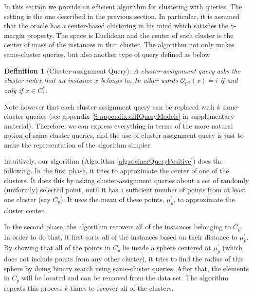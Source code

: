 \documentclass{article}
\newcommand{\mc}{\mathcal}
\newtheorem{definition}[theorem]{Definition}
\begin{document}
In this section we provide an efficient algorithm for clustering with queries. The setting is the one described in the previous section. In particular, it is assumed that the oracle has a center-based clustering in his mind which satisfies the $\gamma$-margin property. The space is Euclidean and the center of each cluster is the center of mass of the instances in that cluster. The algorithm not only makes same-cluster queries, but also another type of query defined as below%


\begin{definition}[Cluster-assignment Query]
A cluster-assignment query asks the cluster index that an instance $x$ belongs to. In other words ${\mc O_{C^*}}(x) = i$ if and only if $x \in C^*_i$.
\end{definition}

Note however that each cluster-assignment query can be replaced with $k$ same-cluster queries (see appendix \ref{S-appendix:diffQueryModels} in supplementary material). Therefore, we can express everything in terms of the more natural notion of same-cluster queries, and the use of cluster-assignment query is just to make the representation of the algorithm simpler.

Intuitively, our algorithm (Algorithm  \ref{alg:steinerQueryPositive}) does the following. In the first phase, it tries to approximate the center of one of the clusters. It does this by asking cluster-assignment queries about a set of randomly (uniformly) selected point, until it has a sufficient number of points from at least one cluster (say $C_p$). It uses the mean of these points, $\mu_p^\prime$, to approximate the cluster center. 

In the second phase, the algorithm recovers all of the instances belonging to $C_p$. In order to do that, it first sorts all of the instances based on their distance to $\mu_p^\prime$. By showing that all of the points in $C_p$ lie inside a sphere centered at $\mu_p^\prime$ (which does not include points from any other cluster), it tries to find the radius of this sphere by doing binary search using same-cluster queries. After that, the elements in $C_p$ will be located and can be removed from the data set. The algorithm repeats this process $k$ times to recover all of the clusters.

\end{document}
